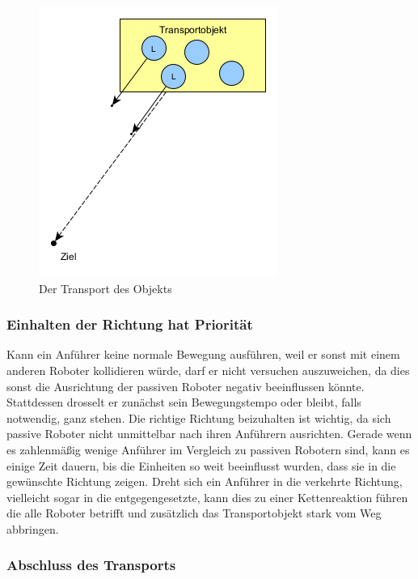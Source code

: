 \begin{figure}
	\includegraphics[width=\pictureWidth,keepaspectratio]{graphics/AlgorithmusTransport.png}
	\caption{Der Transport des Objekts}
	\label{pic:AlgorithmusTransport}
\end{figure}

\subsubsection*{Einhalten der Richtung hat Priorität}
Kann ein Anführer keine normale Bewegung ausführen, weil er sonst mit einem anderen Roboter kollidieren würde, darf er nicht versuchen auszuweichen, da dies sonst die Ausrichtung der passiven Roboter negativ beeinflussen könnte. Stattdessen drosselt er zunächst sein Bewegungstempo oder bleibt, falls notwendig, ganz stehen. Die richtige Richtung beizuhalten ist wichtig, da sich passive Roboter nicht unmittelbar nach ihren Anführern ausrichten. Gerade wenn es zahlenmäßig wenige Anführer im Vergleich zu passiven Robotern sind, kann es einige Zeit dauern, bis die Einheiten so weit beeinflusst wurden, dass sie in die gewünschte Richtung zeigen. Dreht sich ein Anführer in die verkehrte Richtung, vielleicht sogar in die entgegengesetzte, kann dies zu einer Kettenreaktion führen die alle Roboter betrifft und zusätzlich das Transportobjekt stark vom Weg abbringen.

\subsubsection*{Abschluss des Transports}






